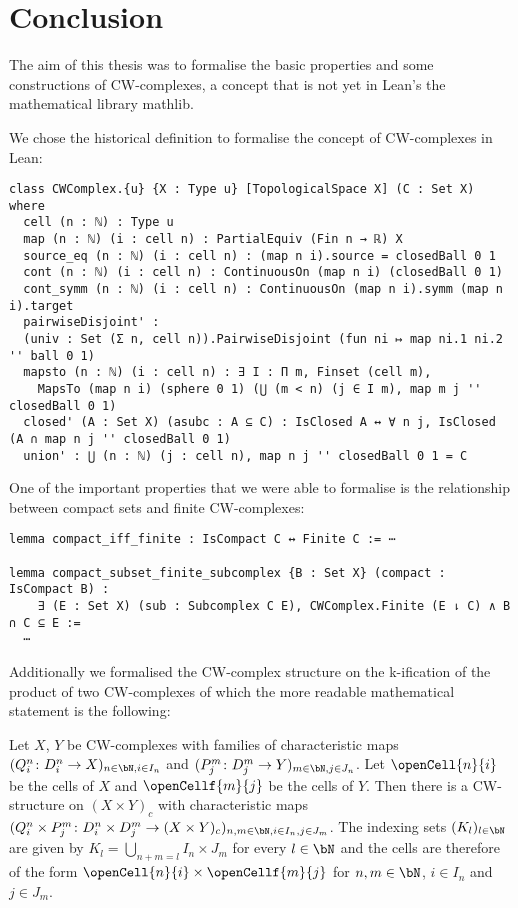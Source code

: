 \chapter*{Conclusion}

The aim of this thesis was to formalise the basic properties and some constructions of CW-complexes, a concept that is not yet in Lean's the mathematical library mathlib. 

We chose the historical definition to formalise the concept of CW-complexes in Lean: 

\begin{lstlisting}
class CWComplex.{u} {X : Type u} [TopologicalSpace X] (C : Set X) where
  cell (n : ℕ) : Type u
  map (n : ℕ) (i : cell n) : PartialEquiv (Fin n → ℝ) X
  source_eq (n : ℕ) (i : cell n) : (map n i).source = closedBall 0 1
  cont (n : ℕ) (i : cell n) : ContinuousOn (map n i) (closedBall 0 1)
  cont_symm (n : ℕ) (i : cell n) : ContinuousOn (map n i).symm (map n i).target
  pairwiseDisjoint' :
  (univ : Set (Σ n, cell n)).PairwiseDisjoint (fun ni ↦ map ni.1 ni.2 '' ball 0 1)
  mapsto (n : ℕ) (i : cell n) : ∃ I : Π m, Finset (cell m),
    MapsTo (map n i) (sphere 0 1) (⋃ (m < n) (j ∈ I m), map m j '' closedBall 0 1)
  closed' (A : Set X) (asubc : A ⊆ C) : IsClosed A ↔ ∀ n j, IsClosed (A ∩ map n j '' closedBall 0 1)
  union' : ⋃ (n : ℕ) (j : cell n), map n j '' closedBall 0 1 = C
\end{lstlisting}

One of the important properties that we were able to formalise is the relationship between compact sets and finite CW-complexes: 

\begin{lstlisting}
lemma compact_iff_finite : IsCompact C ↔ Finite C := ⋯

lemma compact_subset_finite_subcomplex {B : Set X} (compact : IsCompact B) :
    ∃ (E : Set X) (sub : Subcomplex C E), CWComplex.Finite (E ⇂ C) ∧ B ∩ C ⊆ E := 
  ⋯
\end{lstlisting}

Additionally we formalised the CW-complex structure on the k-ification of the product of two CW-complexes of which the more readable mathematical statement is the following: 

\begin{thm*}
    Let $X$, $Y$ be CW-complexes with families of characteristic maps $(Q_i^n \colon D_i^n \to X)_{n \in \bN, i \in I_n}$ and $(P_j^m \colon D_j^m \to Y)_{m \in \bN, j \in J_n}$. 
    Let $\openCell{n}{i}$ be the cells of $X$ and $\openCellf{m}{j}$ be the cells of $Y$.
    Then there is a CW-structure on $(X \times Y)_c$ with characteristic maps $(Q_i^n \times P_j^m \colon D_i^n \times D_j^m \to (X \times Y)_c)_{n,m \in \bN,i \in I_n,j \in J_m}$.
    The indexing sets $(K_l)_{l \in \bN}$ are given by $K_l = \bigcup_{n + m = l}I_n \times J_m$ for every $l \in \bN$ and the cells are therefore of the form $\openCell{n}{i} \times \openCellf{m}{j}$ for $n, m \in \bN$, $i \in I_n$ and $j \in J_m$.
\end{thm*}

